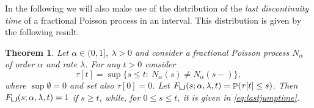 \documentclass[]{amsart}
\numberwithin{equation}{section}
\newtheorem{thm}{Theorem}[section]
\theoremstyle{remark}
\newtheorem{rmk}[thm]{Remark}
\theoremstyle{definition}
\DeclareMathOperator{\bP}{\mathbb{P}}
\begin{document}
In the following we will also make use of the distribution of the \textit{last discontinuity time} of a fractional Poisson process in an interval. This distribution is given by the following result.
\begin{thm}\label{thm:lastjumptime}
	Let $\alpha \in (0,1]$, $\lambda>0$ and consider a fractional Poisson process $N_\alpha$ of order $\alpha$ and rate $\lambda$. For any $t>0$ consider
	\begin{equation}\label{eq:lastjumptime0}
		\tau[t]=\sup\{s \le t: \ N_\alpha(s)\not = N_\alpha(s-)\},
	\end{equation}
	where $\sup \emptyset =0$ and set also $\tau[0]=0$. Let $F_{\sf LJ}(s;\alpha,\lambda,t)=\bP(\tau[t] \le s)$. Then $F_{\sf LJ}(s;\alpha,\lambda,t)=1$ if $s \ge t$, while, for $0 \le s \le t$, it is given in \eqref{eq:lastjumptime}.
\end{thm}
\end{document}
